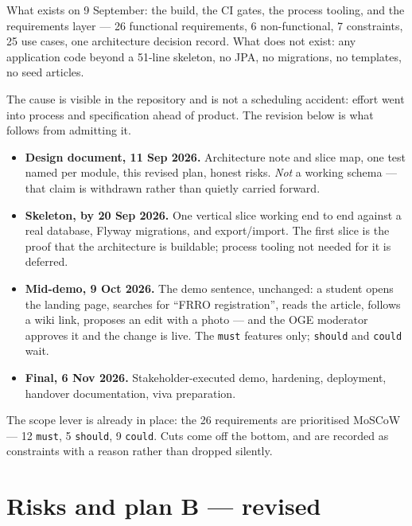 \documentclass[11pt]{article}
\begin{document}
What exists on 9 September: the build, the CI gates, the process tooling, and the requirements layer
--- 26 functional requirements, 6 non-functional, 7 constraints, 25 use cases, one architecture
decision record. What does not exist: any application code beyond a 51-line skeleton, no JPA, no
migrations, no templates, no seed articles.

The cause is visible in the repository and is not a scheduling accident: effort went into process
and specification ahead of product. The revision below is what follows from admitting it.

\begin{itemize}
  \item \textbf{Design document, 11 Sep 2026.} Architecture note and slice map, one test named per
        module, this revised plan, honest risks. \emph{Not} a working schema --- that claim is
        withdrawn rather than quietly carried forward.
  \item \textbf{Skeleton, by 20 Sep 2026.} One vertical slice working end to end against a real
        database, Flyway migrations, and export/import. The first slice is the proof that the
        architecture is buildable; process tooling not needed for it is deferred.
  \item \textbf{Mid-demo, 9 Oct 2026.} The demo sentence, unchanged: a student opens the landing
        page, searches for ``FRRO registration'', reads the article, follows a wiki link, proposes an
        edit with a photo --- and the OGE moderator approves it and the change is live. The
        \texttt{must} features only; \texttt{should} and \texttt{could} wait.
  \item \textbf{Final, 6 Nov 2026.} Stakeholder-executed demo, hardening, deployment, handover
        documentation, viva preparation.
\end{itemize}

The scope lever is already in place: the 26 requirements are prioritised MoSCoW --- 12
\texttt{must}, 5 \texttt{should}, 9 \texttt{could}. Cuts come off the bottom, and are recorded as
constraints with a reason rather than dropped silently.

\section{Risks and plan B --- revised}
\end{document}
